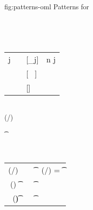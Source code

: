 \documentclass[acmsmall,screen,nonacm,review]{acmart}
\begin{document}
\begin{mathparfig}
  {fig:patterns-oml}
  {Patterns for \OML}
  \begin{bnfgrammar}
    \\
    \entry[Constraints]{\c}{
      \dots
      \and \labenv(\elab/\ct) \leq \tone \to \ttwo
      \and \labenv(\elab/\T) \leq \tone \to \ttwo
      \andcr \cscm \leq \t
      \and \ts \leq \t
      \andcr \x \leq \cscm
      \and \x \leq \ts
    }
 \end{bnfgrammar}
  \\
  \newcommand{\Mrule}[4][]{{#2} \Matches {#3} &\eqdef& {#4} & #1}
  \begin{tabular}{RCLL}
    \Mrule[ n \geq j]
      {\cpatprod \tv j}
      {\shapp[\any \tvcs \Pi\iton \tvcs] \tys}
      {[\tv \is \ty_j]}
    \\[1ex]
    \Mrule
      {\cpatrcd \ct}
      {\shapp[\any \tvcs \tvcs \Tapp] \tys}
      {[\ct \is ~ \T]}
    \\[1ex]
    \Mrule
      {\cpatpoly \cscm}
      {\shapp[\any \tvcs \tpoly \ts] \tys}
      {[\cscm \is \ts \where{\tvcs \is \tys}]}
  \end{tabular}
  \\
    {\semenv \th \labenv(\elab/\ct) \leq \tone \to \ttwo}

    {\semenv \th \cscm \leq \t}

    {\semenv \th \x \leq \cscm}
  \\
  \newcommand{\Srule}[3][]{{#2} &\eqdef& {#3} & {#1}}
  \begin{tabular}{RCLL}
    \Srule[ \labenv(\elab/\T) = \tfor \tvs \t \to \tvs \Tapp]
      {\labenv(\elab/\T) \leq \tone \to \ttwo}
      {\cexists \tvs \cunif \tone \t \cand \cunif \ttwo {\tvs \Tapp}}
    \\[1ex]
    \Srule
      {(\tfor \tvs \tp) \leq \t}
      {\cexists \tvs \cunif \tp \t}
    \\[1ex]
    \Srule
      {\x \leq (\tfor \tvs \t)}
      {\cfor \tvs \capp \x \t}
  \end{tabular}

\end{mathparfig}


\end{document}
